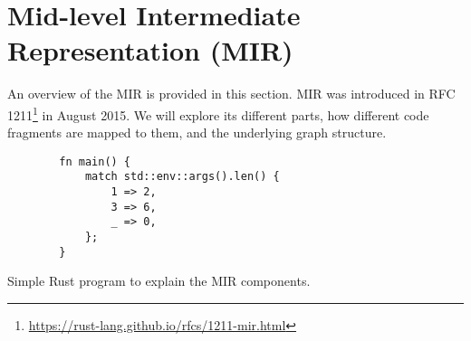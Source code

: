 \section{Mid-level Intermediate Representation (MIR)}

An overview of the \acrfull{MIR} is provided in this section.
\acrshort{MIR} was introduced in
RFC 1211\footnote{\url{https://rust-lang.github.io/rfcs/1211-mir.html}}
in August 2015.
We will explore its different parts,
how different code fragments are mapped to them,
and the underlying graph structure.

\begin{listing}[!htb]
    \begin{verbatim}
        fn main() {
            match std::env::args().len() {
                1 => 2,
                3 => 6,
                _ => 0,
            };
        }
    \end{verbatim}
    \caption{Simple Rust program to explain the MIR components.}
    \label{lst:rust-code-example}
\end{listing}

